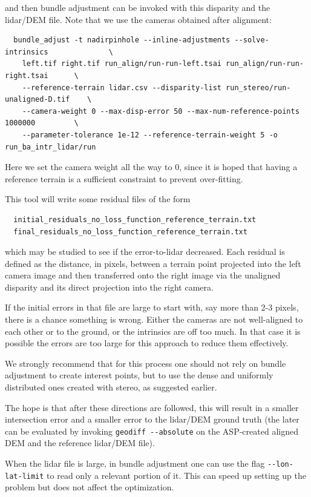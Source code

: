 and then bundle adjustment can be invoked with this disparity and
the lidar/DEM file. Note that we use the cameras obtained after alignment:

\begin{verbatim}
  bundle_adjust -t nadirpinhole --inline-adjustments --solve-intrinsics              \
    left.tif right.tif run_align/run-run-left.tsai run_align/run-run-right.tsai      \
    --reference-terrain lidar.csv --disparity-list run_stereo/run-unaligned-D.tif    \
    --camera-weight 0 --max-disp-error 50 --max-num-reference-points 1000000         \
    --parameter-tolerance 1e-12 --reference-terrain-weight 5 -o run_ba_intr_lidar/run
\end{verbatim}

Here we set the camera weight all the way to 0, since it is hoped that having
a reference terrain is a sufficient constraint to prevent over-fitting.

This tool will write some residual files of the form 
\begin{verbatim}
  initial_residuals_no_loss_function_reference_terrain.txt
  final_residuals_no_loss_function_reference_terrain.txt
\end{verbatim}

which may be studied to see if the error-to-lidar decreased. Each
residual is defined as the distance, in pixels, between a terrain point
projected into the left camera image and then transferred onto the right
image via the unaligned disparity and its direct projection into the
right camera.

If the initial errors in that file are large to start with, say more than 2-3 pixels,
there is a chance something is wrong. Either the cameras are not well-aligned to each 
other or to the ground, or the intrinsics are off too much. In that case it is possible
the errors are too large for this approach to reduce them effectively. 

We strongly recommend that for this process one should not rely on bundle adjustment
to create interest points, but to use the dense and uniformly distributed ones 
created with stereo, as suggested earlier. 

The hope is that after these directions are followed, this will result in a smaller intersection
error and a smaller error to the lidar/DEM ground truth (the later can be evaluated by
invoking \texttt{geodiff -\/-absolute} on the ASP-created aligned DEM
and the reference lidar/DEM file).

When the lidar file is large, in bundle adjustment one can use the flag
\texttt{-\/-lon-lat-limit} to read only a relevant portion of it. This
can speed up setting up the problem but does not affect the
optimization.

